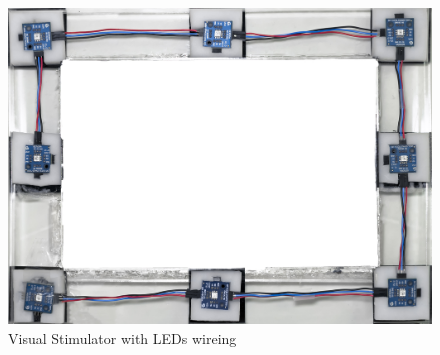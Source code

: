 \begin{figure}[ht]
	\centering
	\includegraphics[width=\textwidth]{chapter6/frame_LED.jpg}
	\caption{Visual Stimulator with LEDs wireing}
\end{figure}